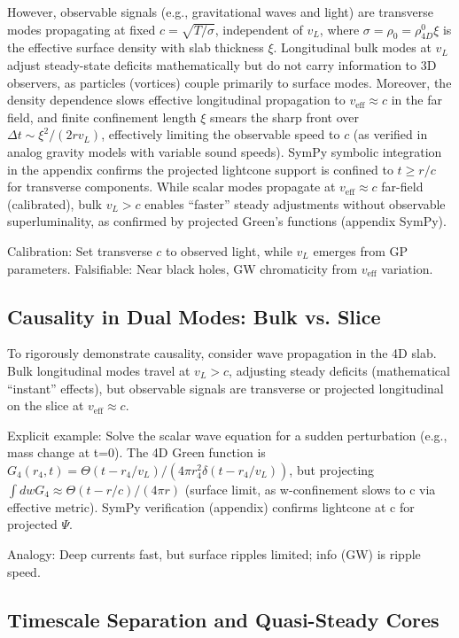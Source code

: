 However, observable signals (e.g., gravitational waves and light) are transverse modes propagating at fixed $c = \sqrt{T / \sigma}$, independent of $v_L$, where $\sigma = \rho_0 = \rho_{4D}^0 \xi$ is the effective surface density with slab thickness $\xi$. Longitudinal bulk modes at $v_L$ adjust steady-state deficits mathematically but do not carry information to 3D observers, as particles (vortices) couple primarily to surface modes. Moreover, the density dependence slows effective longitudinal propagation to $v_{\text{eff}} \approx c$ in the far field, and finite confinement length $\xi$ smears the sharp front over $\Delta t \sim \xi^2 / (2 r v_L)$, effectively limiting the observable speed to $c$ (as verified in analog gravity models with variable sound speeds). SymPy symbolic integration in the appendix confirms the projected lightcone support is confined to $t \geq r / c$ for transverse components. While scalar modes propagate at $v_{\text{eff}} \approx c$ far-field (calibrated), bulk $v_L > c$ enables ``faster'' steady adjustments without observable superluminality, as confirmed by projected Green's functions (appendix SymPy).

Calibration: Set transverse $c$ to observed light, while $v_L$ emerges from GP parameters. Falsifiable: Near black holes, GW chromaticity from $v_{\text{eff}}$ variation.

\subsection{Causality in Dual Modes: Bulk vs. Slice}

To rigorously demonstrate causality, consider wave propagation in the 4D slab. Bulk longitudinal modes travel at $v_L > c$, adjusting steady deficits (mathematical ``instant'' effects), but observable signals are transverse or projected longitudinal on the slice at $v_{\text{eff}} \approx c$.

Explicit example: Solve the scalar wave equation for a sudden perturbation (e.g., mass change at t=0). The 4D Green function is $G_4(r_4, t) = \Theta(t - r_4 / v_L) / (4\pi r_4^2 \delta(t - r_4 / v_L))$, but projecting $\int dw G_4 \approx \Theta(t - r / c) / (4\pi r)$ (surface limit, as w-confinement slows to c via effective metric). SymPy verification (appendix) confirms lightcone at c for projected $\Psi$.

Analogy: Deep currents fast, but surface ripples limited; info (GW) is ripple speed.

\subsection{Timescale Separation and Quasi-Steady Cores}

